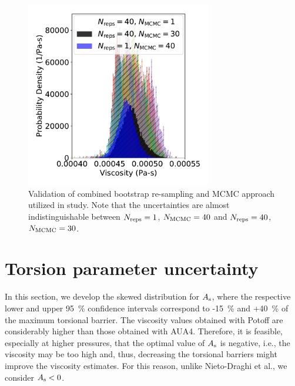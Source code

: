 \documentclass[preprint,review,11pt]{elsarticle}
\begin{document}
	\begin{figure}[htb!]
		\centering
		\includegraphics[width=3.2in]{MCMC_validation.pdf}
		\caption{Validation of combined bootstrap re-sampling and MCMC approach utilized in study. Note that the uncertainties are almost indistinguishable between $N_{\rm reps} = 1$, $N_{\rm MCMC} = 40$ and $N_{\rm reps} = 40$, $N_{\rm MCMC} = 30$.}
		\label{fig:MCMC_validation}
	\end{figure}
	
    \clearpage
	\newpage
	
    \section{Torsion parameter uncertainty} \label{SI:MCMC torsions}
	
%	
%	 
%	
%	
%	
	
	
	In this section, we develop the skewed distribution for $A_{\rm s}$, where the respective lower and upper 95~\% confidence intervals correspond to -15~\% and +40~\% of the maximum torsional barrier. The viscosity values obtained with Potoff are considerably higher than those obtained with AUA4. Therefore, it is feasible, especially at higher pressures, that the optimal value of $A_{\rm s}$ is negative, i.e., the viscosity may be too high and, thus, decreasing the torsional barriers might improve the viscosity estimates. For this reason, unlike Nieto-Draghi et al., we consider $A_{\rm s} < 0$.
	
\end{document}
